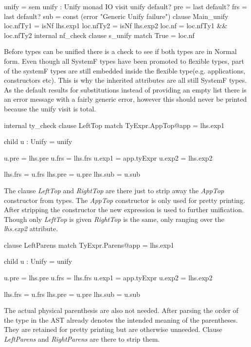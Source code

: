 \begin{code}
unify = sem unify : Unify monad IO    
          visit unify
             default? pre = last
             default? frs = last
             default? sub = const (error "Generic Unify failure")
             clause Main_unify
               loc.nfTy1 = isNf lhs.exp1
               loc.nfTy2 = isNf lhs.exp2
               loc.nf    = loc.nfTy1 && loc.nfTy2
               internal nf_check
                 clause s_unify
                   match True  = loc.nf
\end{code}
Before types can be unified there is a check to see if both types are in Normal form. Even though all SystemF types have been promoted to flexible types, part of the systemF types are still embedded inside the flexible type(e.g. applications, constructors etc). This is why the inherited attributes are all still SystemF types. As the default results for substitutions instead of providing an empty list there is an error message with a fairly generic error, however this should never be printed because the unify visit is total.

\begin{code}
internal ty_check
  clause LeftTop
    match TyExpr.AppTop@app = lhs.exp1
    
    child u : Unify = unify
    
    u.pre  = lhs.pre
    u.frs  = lhs.frs
    u.exp1 = app.tyExpr
    u.exp2 = lhs.exp2
    
    lhs.frs = u.frs
    lhs.pre = u.pre
    lhs.sub = u.sub
\end{code}
The clause \emph{LeftTop} and \emph{RightTop} are there just to strip away the \emph{AppTop} constructor from types. The \emph{AppTop} constructor is only used for pretty printing. After stripping the constructor the new expression is used to further unification. Though only \emph{LeftTop} is given \emph{RightTop} is the same, only ranging over the \emph{lhs.exp2} attribute.

\begin{code}
clause LeftParens
  match TyExpr.Parens@app = lhs.exp1
  
  child u : Unify = unify
  
  u.pre  = lhs.pre
  u.frs  = lhs.frs
  u.exp1 = app.tyExpr
  u.exp2 = lhs.exp2
  
  lhs.frs = u.frs
  lhs.pre = u.pre
  lhs.sub = u.sub
\end{code}
The actual physical parenthesis are also not needed. After parsing the order of the type in the AST already denotes the intended meaning of the parentheses. They are retained for pretty printing but are otherwise unneeded. Clause \emph{LeftParens} and \emph{RightParens} are there to strip them.

